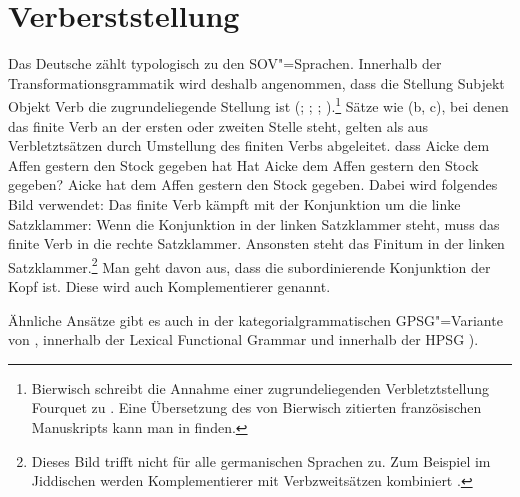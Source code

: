 \section{Verberststellung}
\label{sec-v1}\label{Abschnitt-V1}

Das Deutsche zählt typologisch zu den SOV"=Sprachen. Innerhalb der
Transformationsgrammatik 
wird deshalb angenommen, dass die Stellung Subjekt Objekt Verb die zugrundeliegende Stellung ist (\citealp{Bach62a}; \citealp*[]{Bierwisch63a};
\citealp{Reis74a}; \citealp[Kapitel~1]{Thiersch78a}).\footnote{%
  Bierwisch schreibt die Annahme einer zugrundeliegenden Verbletztstellung Fourquet
  zu \citep{Fourquet57a}. Eine Übersetzung des von Bierwisch zitierten
  französischen Manuskripts kann man in 
  finden.%
}
Sätze wie (b, c), bei denen das finite Verb an der ersten oder zweiten Stelle steht,
gelten als aus Verbletztsätzen durch Umstellung des finiten Verbs abgeleitet.
\eal
\ex dass Aicke dem Affen gestern den Stock gegeben hat
\ex Hat Aicke dem Affen gestern den Stock gegeben?
\ex Aicke hat dem Affen gestern den Stock gegeben.
\zl
Dabei wird folgendes Bild verwendet: Das finite Verb kämpft mit der Konjunktion um die linke Satzklammer:
Wenn die Konjunktion in der linken Satzklammer steht, muss das finite Verb in die rechte Satzklammer.
Ansonsten steht das Finitum in der linken Satzklammer.\footnote{
  Dieses Bild trifft nicht für alle germanischen Sprachen zu. Zum Beispiel im Jiddischen werden
  Komplementierer mit Verbzweitsätzen kombiniert \citep[]{Diesing2004a}.
} Man geht davon aus, dass die subordinierende Konjunktion
der Kopf ist. Diese wird auch Komplementierer genannt.

Ähnliche Ansätze gibt es auch in der kategorialgrammatischen GPSG"=Variante von \citet[]{Jacobs86a}, innerhalb der Lexical Functional Grammar \citep{Berman96a-u} und innerhalb der HPSG
\label{Seite-V1-via-Lexikonregel}\parencites{KW91a}{Oliva92b}{Netter92}{Frank94}{Kiss95a}{Feldhaus97}{Meurers2000b}{Mueller2005c,MuellerGS}).\addpages


